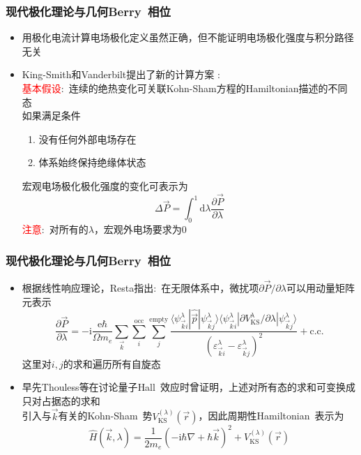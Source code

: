 \documentclass[cjk,slidestop,compress,mathserif,blue]{beamer}
\newcommand{\upcite}[1]{\hspace{0ex}\textsuperscript{\cite{#1}}} %
\begin{document}
\frame
{
	\frametitle{现代极化理论与几何\textrm{Berry~}相位}
	\begin{itemize}
		\item 用极化电流计算电场极化定义虽然正确，但不能证明电场极化强度与积分路径无关
		\item \textrm{King-Smith}和\textrm{Vanderbilt}提出了新的计算方案%
			:\\
		\textcolor{red}{基本假设}:~连续的绝热变化可关联\textrm{Kohn-Sham}方程的\textrm{Hamiltonian}描述的不同态\\如果满足条件
	\begin{enumerate}
		\item 没有任何外部电场存在 
		\item 体系始终保持绝缘体状态
	\end{enumerate}
	宏观电场极化极化强度的变化可表示为
	\begin{displaymath}
		\Delta\vec P=\int_0^1\mathrm{d}\lambda\frac{\partial\vec P}{\partial\lambda}
	\end{displaymath}
	\textcolor{red}{注意}:~对所有的$\lambda$，宏观外电场要求为0
	\end{itemize}
}

\frame
{
	\frametitle{现代极化理论与几何\textrm{Berry~}相位}
	\begin{itemize}
		\item 根据线性响应理论，\textrm{Resta}指出:~在无限体系中，微扰项$\partial\vec P/\partial\lambda$可以用动量矩阵元表示%
	\begin{displaymath}
		\frac{\partial\vec P}{\partial\lambda}=-\mathrm{i}\frac{\mathrm{e}\hbar}{\Omega m_e}\sum_{\vec k}\sum_i^{\mathrm{occ}}\sum_j^{\mathrm{empty}}\frac{\langle\psi_{\vec k i}^{\lambda}|\hat{\vec p}|\psi_{\vec k j}^{\lambda}\rangle\langle\psi_{\vec k i}^{\lambda}|\partial V_{\mathrm{KS}}^{\lambda}/\partial\lambda|\psi_{\vec k j}^{\lambda}\rangle}{(\varepsilon_{\vec k i}^{\lambda}-\varepsilon_{\vec k j}^{\lambda})^2}+\mathrm{c.c.}
	\end{displaymath}
	这里对$i,j$的求和遍历所有自旋态
	\item 早先\textrm{Thouless}等在讨论量子\textrm{Hall~}效应时曾证明，上述对所有态的求和可变换成只对占据态的求和%
		\\引入与$\vec k$有关的\textrm{Kohn-Sham~}势$V_{\mathrm{KS}}^{(\lambda)}(\vec r)$，因此周期性\textrm{Hamiltonian~}表示为
	\begin{displaymath}
		\hat H(\vec k,\lambda)=\frac1{2m_e}\left( -\mathrm{i}\hbar\nabla+\hbar\vec k \right)^2+V_{\mathrm{KS}}^{(\lambda)}(\vec r)
	\end{displaymath}
	\end{itemize}
}
\end{document}
